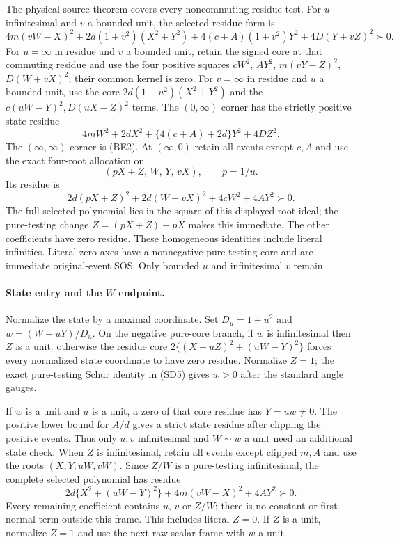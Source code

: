 The physical-source theorem covers every noncommuting residue test.
For $u$ infinitesimal and $v$ a bounded unit, the selected residue form is
\[
 4m(vW-X)^2+2d(1+v^2)(X^2+Y^2)
 +4(c+A)(1+v^2)Y^2+4D(Y+vZ)^2\succ0.
\]
For $u=\infty$ in residue and $v$ a bounded unit, retain the signed
core at that commuting residue and use the four positive squares
$cW^2$, $AY^2$, $m(vY-Z)^2$, $D(W+vX)^2$; their common kernel is zero.
For $v=\infty$ in residue and $u$ a bounded unit, use the core
$2d(1+u^2)(X^2+Y^2)$ and the $c(uW-Y)^2,D(uX-Z)^2$ terms.
The $(0,\infty)$ corner has the strictly positive state residue
\[
 4mW^2+2dX^2+\{4(c+A)+2d\}Y^2+4DZ^2.
\]
The $(\infty,\infty)$ corner is (BE2).
At $(\infty,0)$ retain all events except $c,A$ and use the exact
four-root allocation on
\[
 (pX+Z,\,W,\,Y,\,vX),\qquad p=1/u.
\]
Its residue is
\[
 2d(pX+Z)^2+2d(W+vX)^2+4cW^2+4AY^2\succ0.
\]
The full selected polynomial lies in the square of this displayed
root ideal; the pure-testing change $Z=(pX+Z)-pX$ makes this immediate.
The other coefficients have zero residue. These homogeneous
identities include literal infinities. Literal zero axes have a
nonnegative pure-testing core and are immediate original-event SOS.
Only bounded $u$ and infinitesimal $v$ remain.

\paragraph{State entry and the $W$ endpoint.}
Normalize the state by a maximal coordinate. Set
$D_u=1+u^2$ and $w=(W+uY)/D_u$. On the negative pure-core branch,
if $w$ is infinitesimal then $Z$ is a unit: otherwise the residue core
$2\{(X+uZ)^2+(uW-Y)^2\}$ forces every normalized state coordinate
to have zero residue. Normalize $Z=1$; the exact pure-testing Schur
identity in (SD5) gives $w>0$ after the standard angle gauges.

If $w$ is a unit and $u$ is a unit, a zero of that core residue has
$Y=uw\ne0$. The positive lower bound for $A/d$ gives a strict state
residue after clipping the positive events. Thus only $u,v$
infinitesimal and $W\sim w$ a unit need an additional state check.
When $Z$ is infinitesimal, retain all events except clipped $m,A$ and
use the roots $(X,Y,uW,vW)$. Since $Z/W$ is a pure-testing
infinitesimal, the complete selected polynomial has residue
\[
 2d\{X^2+(uW-Y)^2\}+4m(vW-X)^2+4AY^2\succ0.
 \tag{BE4}
\]
Every remaining coefficient contains $u$, $v$ or $Z/W$; there is no
constant or first-normal term outside this frame. This includes
literal $Z=0$. If $Z$ is a unit, normalize $Z=1$ and use the next
raw scalar frame with $w$ a unit.


